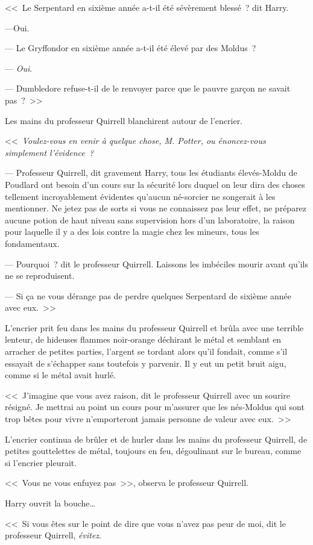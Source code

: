 <<~Le Serpentard en sixième année a-t-il été sévèrement blessé~? dit Harry.

---Oui.

--- Le Gryffondor en sixième année a-t-il été élevé par des Moldus~?

--- \emph{Oui}.

--- Dumbledore refuse-t-il de le renvoyer parce que le pauvre garçon ne savait pas~?~>>

Les mains du professeur Quirrell blanchirent autour de l'encrier.

<<~\emph{Voulez-vous en venir à quelque chose, M. Potter, ou énoncez-vous simplement l'évidence~?}

--- Professeur Quirrell, dit gravement Harry, tous les étudiants élevés-Moldu de Poudlard ont besoin d'un cours sur la sécurité lors duquel on leur dira des choses tellement incroyablement évidentes qu'aucun né-sorcier ne songerait à les mentionner. Ne jetez pas de sorts si vous ne connaissez pas leur effet, ne préparez aucune potion de haut niveau sans supervision hors d'un laboratoire, la raison pour laquelle il y a des lois contre la magie chez les mineurs, tous les fondamentaux.

--- Pourquoi~? dit le professeur Quirrell. Laissons les imbéciles mourir avant qu'ils ne se reproduisent.

--- Si ça ne vous dérange pas de perdre quelques Serpentard de sixième année avec eux.~>>

L'encrier prit feu dans les mains du professeur Quirrell et brûla avec une terrible lenteur, de hideuses flammes noir-orange déchirant le métal et semblant en arracher de petites parties, l'argent se tordant alors qu'il fondait, comme s'il essayait de s'échapper sans toutefois y parvenir. Il y eut un petit bruit aigu, comme si le métal avait hurlé.

<<~J'imagine que vous avez raison, dit le professeur Quirrell avec un sourire résigné. Je mettrai au point un cours pour m'assurer que les nés-Moldus qui sont trop bêtes pour vivre n'emporteront jamais personne de valeur avec eux.~>>

L'encrier continua de brûler et de hurler dans les mains du professeur Quirrell, de petites gouttelettes de métal, toujours en feu, dégoulinant sur le bureau, comme si l'encrier pleurait.

<<~Vous ne vous enfuyez pas~>>, observa le professeur Quirrell.

Harry ouvrit la bouche…

<<~Si vous êtes sur le point de dire que vous n'avez pas peur de moi, dit le professeur Quirrell, \emph{évitez}.

